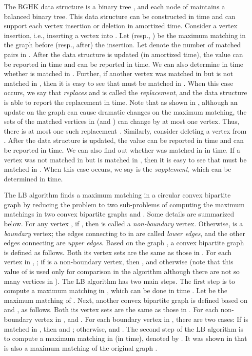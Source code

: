 \documentclass[11pt]{article}
\begin{document}
The BGHK data structure \cite{ref:BrodalDy07} is a binary tree ,
and each node of  maintains a balanced binary tree. This data structure
can be constructed in  time and can
support each vertex insertion or deletion in  amortized time.
Consider a vertex insertion, i.e., inserting a vertex  into . Let
 (resp., ) be the maximum matching in the graph before
(resp., after) the insertion. Let  denote the number of matched
pairs in .  After the data structure is updated (in 
amortized time), the value  can be reported in  time
and  can be reported in  time. We can also determine in
 time whether  is matched in . Further, if another
vertex  was matched in  but is not matched in ,
then it is easy to see that  must be matched in . When this
case occurs, we say that  {\em replaces}  and  is called
the {\em replacement}, and the data structure is able to report the
replacement in  time. Note that as shown in
\cite{ref:BrodalDy07}, although an update on the graph can cause
dramatic changes on the maximum matching, the sets of the
matched vertices in  (and ) can change by at most one
vertex. Thus, there is at most one such replacement .  Similarly,
consider deleting a vertex  from . After the data structure
is updated, the value  can be reported in  time and 
can be reported in  time. We can also find out whether  was
matched in  in  time. If a vertex  was not
matched in  but is matched in ,
then it is easy to see that  must be matched in . When this
case occurs, we say  is the {\em
supplement}, which can be determined in  time.


The LB algorithm \cite{ref:LiangCi95} finds a maximum matching in
a circular convex bipartite graph  by reducing the
problem to two sub-problems of computing the maximum matchings in two
convex bipartite graphs  and . Some details are summarized
below. For any vertex , if , then
 is called a {\em non-boundary} vertex. Otherwise,  is a {\em
boundary} vertex; the edges connecting  to
 in  are called {\em lower
edges}, and the other edges connecting  are {\em upper edges}.
Based on the graph , a convex bipartite graph
 is defined as follows. Both its vertex sets are
the same as those in . For each vertex  in ,
; if  is a non-boundary vertex,
then , and otherwise  (note
that this value of  is used only for comparison in the algorithm
although there are not so many vertices in ). The LB
algorithm has two main steps. The first step is to compute a
maximum matching in , which can be done in  time
\cite{ref:GabowA85,ref:LipskiEf81,ref:SteinerA96}. Let  be
the maximum matching of . Next, another convex
bipartite graph  is defined based on  and , as
follows. Both its vertex sets are the same as those in . For each
non-boundary vertex  in ,  and
. For each boundary vertex  in ,
there are two cases: If  is matched in , then
 and ; otherwise,
 and . The second step of the LB
algorithm is to compute a maximum matching in  (in 
time), denoted by . It was shown in \cite{ref:LiangCi95}
that  is also a maximum matching of the original graph .
\end{document}
